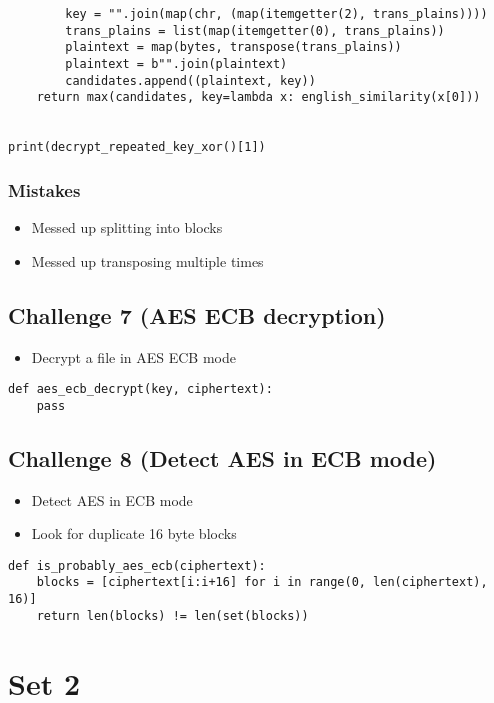 \documentclass[11pt]{article}
\begin{document}
\begin{itemize}
\begin{verbatim}
        key = "".join(map(chr, (map(itemgetter(2), trans_plains))))
        trans_plains = list(map(itemgetter(0), trans_plains))
        plaintext = map(bytes, transpose(trans_plains))
        plaintext = b"".join(plaintext)
        candidates.append((plaintext, key))
    return max(candidates, key=lambda x: english_similarity(x[0]))


print(decrypt_repeated_key_xor()[1])
\end{verbatim}
\end{itemize}

\subsubsection{Mistakes}
\label{sec:org6725b33}
\begin{itemize}
\item Messed up splitting into blocks
\item Messed up transposing multiple times
\end{itemize}
\subsection{Challenge 7 (AES ECB decryption)}
\label{sec:org4966adf}
\begin{itemize}
\item Decrypt a file in AES ECB mode
\end{itemize}
\begin{verbatim}
def aes_ecb_decrypt(key, ciphertext):
    pass
\end{verbatim}
\subsection{Challenge 8 (Detect AES in ECB mode)}
\label{sec:org8120f9d}
\begin{itemize}
\item Detect AES in ECB mode
\item Look for duplicate 16 byte blocks
\end{itemize}
\begin{verbatim}
def is_probably_aes_ecb(ciphertext):
    blocks = [ciphertext[i:i+16] for i in range(0, len(ciphertext), 16)]
    return len(blocks) != len(set(blocks))
\end{verbatim}
\section{Set 2}
\label{sec:org56570f3}
\end{document}
